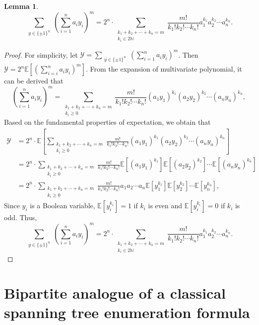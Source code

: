 \documentclass[10pt,a4paper]{article}
\newtheorem{lemma}{Lemma}
\newtheorem{false statement}{False statement}
\theoremstyle{definition}
\begin{document}
\begin{lemma}\label{bo}
$$
		\sum_{\substack{y \in \{\pm1\}^n}} \left(\sum_{i=1}^n a_i y_i \right)^m=
			2^n\cdot\sum\limits_{\substack{k_1+k_2+\cdots+k_n=m\\k_i\in 2\mathbb{N} }}\frac{m!}{k_1!k_2!\cdots k_n!}a_1^{k_1}a_2^{k_2}\cdots a_n^{k_n}.
$$	
\end{lemma}

\begin{proof}
	For simplicity, let $\mathcal{Y}=\sum_{\substack{y \in \{\pm1\}^n}} \left( \sum_{i=1}^n a_i y_i \right)^m$. Then $\mathcal{Y}=2^n\mathbb{E}[(\sum_{i=i}^{n}a_iy_i)^m]$. From the expansion of multivariate polynomial, it can be derived that $$\left(\sum_{i=1}^{n}a_iy_i\right)^m=\sum_{\substack{k_1+k_2+\cdots+k_n=m\\k_i\geq0 }}\frac{m!}{k_1!k_2!\cdots k_n!}(a_1y_1)^{k_1}(a_2y_2)^{k_2}\cdots(a_ny_n)^{k_n},$$
	Based on the fundamental properties of expectation, we obtain that
	\begin{align*}
		\mathcal{Y} &=2^n\cdot\mathbb{E}[\sum_{\substack{k_1+k_2+\cdots+k_n=m\\k_i\geq0 }}\frac{m!}{k_1!k_2!\cdots k_n!}(a_1y_1)^{k_1}(a_2y_2)^{k_2}\cdots(a_ny_n)^{k_n}]\\
		&=2^n\cdot\sum_{\substack{k_1+k_2+\cdots+k_n=m\\k_i\geq0 }}\frac{m!}{k_1!k_2!\cdots k_n!}\mathbb{E}[(a_1y_1)^{k_1}]\mathbb{E}[(a_2y_2)^{k_2}]\cdots\mathbb{E}[(a_ny_n)^{k_n}]\\
		&=2^n\cdot\sum_{\substack{k_1+k_2+\cdots+k_n=m\\k_i\geq0 }}\frac{m!}{k_1!k_2!\cdots k_n!}a_1a_2\cdots a_n\mathbb{E}[y_1^{k_1}]\mathbb{E}[y_2^{k_2}]\cdots\mathbb{E}[y_n^{k_n}],
	\end{align*}	
	Since $y_i$ is a Boolean variable, $\mathbb{E}[y_i^{k_i}]=1$ if $k_i$ is even and $\mathbb{E}[y_i^{k_i}]=0$ if $k_i$ is odd. Thus, 
$$
		\sum_{\substack{y \in \{\pm1\}^n}} \left(\sum_{i=1}^n a_i y_i \right)^m=
			2^n\cdot\sum\limits_{\substack{k_1+k_2+\cdots+k_n=m\\k_i\in 2\mathbb{N} }}\frac{m!}{k_1!k_2!\cdots k_n!}a_1^{k_1}a_2^{k_2}\cdots a_n^{k_n}.
$$	
\end{proof}













\section{Bipartite analogue of a classical spanning tree
enumeration formula}
\end{document}
